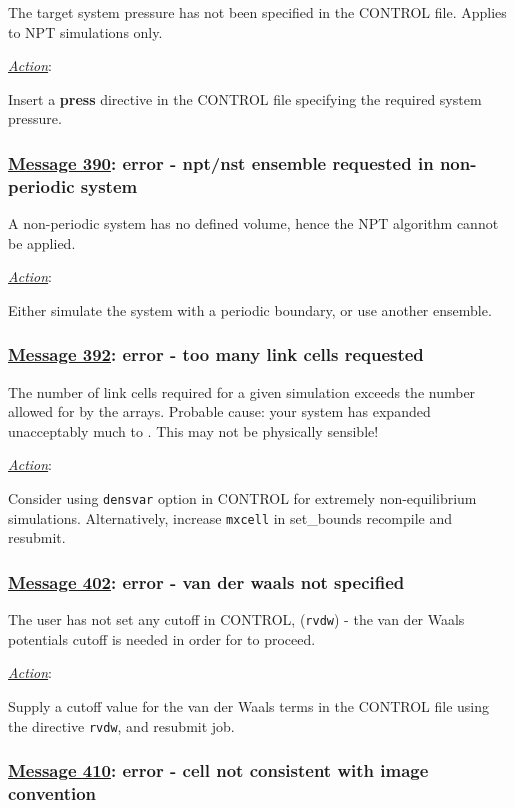 The target system pressure has not been specified in the CONTROL
file.  Applies to NPT simulations only.

\noindent \underline{\em Action}:

Insert a {\bf press} directive in the CONTROL file specifying the
required system pressure.

\subsubsection*{\underline{Message 390}: error - npt/nst ensemble requested in non-periodic system}

A non-periodic system has no defined volume, hence the NPT
algorithm cannot be applied.

\noindent \underline{\em Action}:

Either simulate the system with a periodic boundary, or use
another ensemble.

\subsubsection*{\underline{Message 392}: error - too many link cells requested}

The number of link cells required for a given simulation exceeds
the number allowed for by the \D arrays.  Probable cause:  your
system has expanded unacceptably much to \D.  This may not be
physically sensible!

\noindent \underline{\em Action}:

Consider using {\tt densvar} option in CONTROL for extremely
non-equilibrium simulations.  Alternatively, increase {\tt mxcell}
in {\sc set\_bounds} recompile and resubmit.

\subsubsection*{\underline{Message 402}: error - van der waals not specified}

The user has not set any cutoff in CONTROL, ({\tt rvdw}) - the van
der Waals potentials cutoff is
needed in order for \D to proceed.

\noindent \underline{\em Action}:

Supply a cutoff value for the van der Waals terms in the CONTROL
file using the directive {\tt rvdw}, and resubmit job.

\subsubsection*{\underline{Message 410}: error - cell not consistent with image convention}

